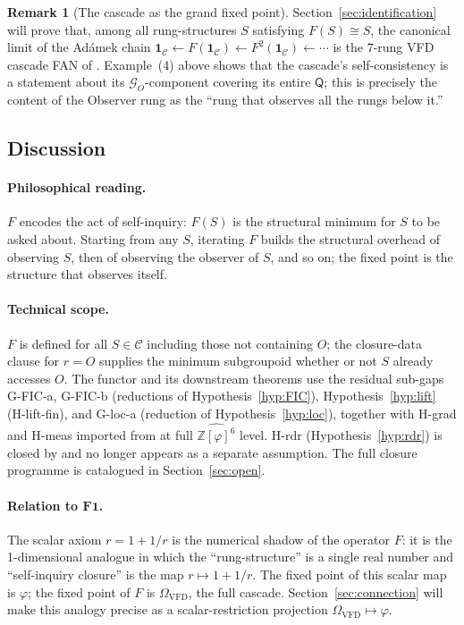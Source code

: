 \documentclass[11pt, a4paper]{amsart}
\theoremstyle{definition}
\newtheorem{remark}[theorem]{Remark}
\newcommand{\Z}{\mathbb{Z}}
\newcommand{\catC}{\mathcal{C}}
\newcommand{\Omegacap}{\Omega_{\mathrm{VFD}}}
\newcommand{\Gcal}{\mathcal{G}}
\newcommand{\Qalg}{\mathsf{Q}}
\begin{document}
\begin{remark}[The cascade as the grand fixed point]
\label{rmk:cascade-fixed-point}
Section~\ref{sec:identification} will prove that, among all
rung-structures $S$ satisfying $F(S) \cong S$, the canonical
limit of the Ad\'amek chain
$\mathbf{1}_\catC \xleftarrow{} F(\mathbf{1}_\catC)
\xleftarrow{} F^2(\mathbf{1}_\catC) \xleftarrow{} \cdots$
is the $7$-rung VFD cascade FAN of
\cite{CascadeCompletenessAudit}. Example~(4) above shows that
the cascade's self-consistency is a statement about its
$\Gcal_O$-component covering its entire $\Qalg$; this is
precisely the content of the Observer rung as the ``rung that
observes all the rungs below it.''
\end{remark}

\subsection{Discussion}
\label{subsec:F-discussion}

\paragraph{Philosophical reading.} $F$ encodes the act of
self-inquiry: $F(S)$ is the structural minimum for $S$ to be
asked about. Starting from any $S$, iterating $F$ builds the
structural overhead of observing $S$, then of observing the
observer of $S$, and so on; the fixed point is the structure
that observes itself.

\paragraph{Technical scope.} $F$ is defined for all $S \in \catC$
including those not containing $O$; the closure-data clause for
$r = O$ supplies the minimum subgroupoid whether or not $S$
already accesses $O$. The functor and its downstream theorems
use the residual sub-gaps G-FIC-a, G-FIC-b (reductions of
Hypothesis~\ref{hyp:FIC}), Hypothesis~\ref{hyp:lift}
(H-lift-fin), and G-loc-a (reduction of
Hypothesis~\ref{hyp:loc}), together with H-grad and H-meas
imported from \cite{CascadeAccessPrinciple} at full
$\widehat{\Z[\varphi]^6}$ level. H-rdr
(Hypothesis~\ref{hyp:rdr}) is closed by
\cite{CascadeHrdrClosure} and no longer appears as a separate
assumption. The full closure programme is catalogued in
Section~\ref{sec:open}.

\paragraph{Relation to $\mathbf{F1}$.} The scalar axiom $r = 1 +
1/r$ is the numerical shadow of the operator $F$: it is the
1-dimensional analogue in which the ``rung-structure'' is a
single real number and ``self-inquiry closure'' is the map
$r \mapsto 1 + 1/r$. The fixed point of this scalar map is
$\varphi$; the fixed point of $F$ is $\Omegacap$, the full
cascade. Section~\ref{sec:connection} will make this analogy
precise as a scalar-restriction projection $\Omegacap \mapsto
\varphi$.
\end{document}
